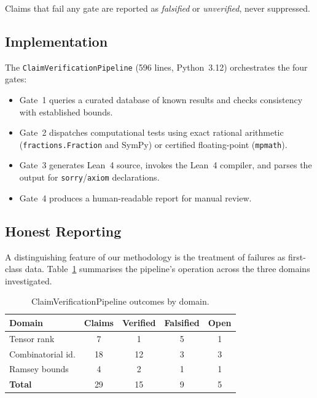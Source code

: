\documentclass[11pt,a4paper]{article}
\begin{document}
\noindent Claims that fail any gate are reported as \emph{falsified} or
\emph{unverified}, never suppressed.

\subsection{Implementation}

The \texttt{ClaimVerificationPipeline} (596 lines, Python~3.12) orchestrates
the four gates:
\begin{itemize}
  \item Gate~1 queries a curated database of known results and checks
    consistency with established bounds.
  \item Gate~2 dispatches computational tests using exact rational arithmetic
    (\texttt{fractions.Fraction} and SymPy) or certified floating-point
    (\texttt{mpmath}).
  \item Gate~3 generates Lean~4 source, invokes the Lean~4 compiler, and
    parses the output for \texttt{sorry}/\texttt{axiom} declarations.
  \item Gate~4 produces a human-readable report for manual review.
\end{itemize}

\subsection{Honest Reporting}

A distinguishing feature of our methodology is the treatment of failures as
first-class data. Table~\ref{tab:pipeline} summarises the pipeline's
operation across the three domains investigated.

\begin{table}[ht]
\centering
\caption{ClaimVerificationPipeline outcomes by domain.}\label{tab:pipeline}
\begin{tabular}{@{}lcccc@{}}
\toprule
\textbf{Domain} & \textbf{Claims} & \textbf{Verified} & \textbf{Falsified} & \textbf{Open} \\
\midrule
Tensor rank       & 7  & 1  & 5 & 1 \\
Combinatorial id. & 18 & 12 & 3 & 3 \\
Ramsey bounds     & 4  & 2  & 1 & 1 \\
\addlinespace
\textbf{Total}    & 29 & 15 & 9 & 5 \\
\bottomrule
\end{tabular}
\end{table}

\end{document}
